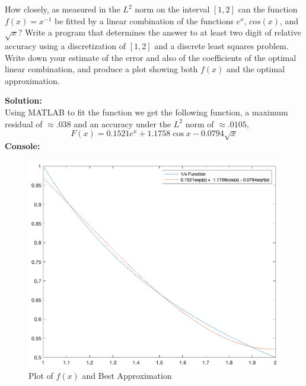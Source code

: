 \documentclass[12pt]{article}
\makeatletter
\theoremstyle{homework}
\newenvironment{exercise}[1]
{\def\@currentlabel{#1}\exercisecore}
{\endexercisecore}
\newcommand{\localhead}[1]{\par\smallskip\noindent\textbf{#1}\nobreak\\}%
\newcommand\solution{\localhead{Solution:}}
\makeatother
\begin{document}
\begin{exercise}{P17} How closely, as measured in the $L^2$ norm on the interval $[1, 2]$ can the function 
  $f(x) = x^{-1}$ be fitted by a linear combination of the functions $e^x$, $cos(x)$, and $\sqrt{x}$? Write 
  a program that determines the answer to at least two digit of relative accuracy using a discretization of $[1, 2]$
  and a discrete least squares problem. Write down your estimate of the error and also of the coefficients of 
  the optimal linear combination, and produce a plot showing both $f(x)$ and the optimal approximation.\\
  \solution Using MATLAB to fit the function we get the following function, a maximum residual of $\approx .038$
  and an accuracy under the $L^2$ norm of $\approx .0105$,
  \begin{equation*}
    F(x) = 0.1521e^x +  1.1758\cos{x} - 0.0794\sqrt{x}
  \end{equation*}
  \textbf{Console:}
  \begin{center}
    
  \end{center} 
    \begin{figure}[H]
      \begin{center}
        \caption{Plot of $f(x)$ and Best Approximation}
      \includegraphics[width = .85\textwidth]{plot.png}
      \end{center}
    \end{figure}
  


\end{exercise}
\end{document}

